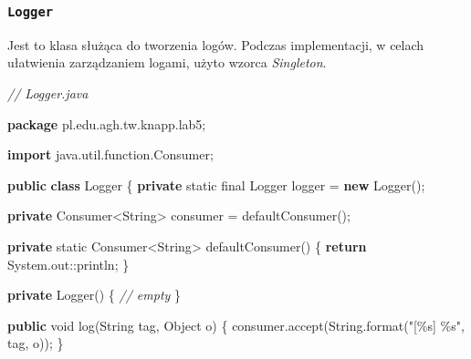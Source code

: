 \documentclass[11pt]{article}
\newenvironment{Shaded}{}{}
\newcommand{\KeywordTok}[1]{\textcolor[rgb]{0.00,0.44,0.13}{\textbf{{#1}}}}
\newcommand{\DataTypeTok}[1]{\textcolor[rgb]{0.56,0.13,0.00}{{#1}}}
\newcommand{\StringTok}[1]{\textcolor[rgb]{0.25,0.44,0.63}{{#1}}}
\newcommand{\CommentTok}[1]{\textcolor[rgb]{0.38,0.63,0.69}{\textit{{#1}}}}
\newcommand{\FunctionTok}[1]{\textcolor[rgb]{0.02,0.16,0.49}{{#1}}}
\newcommand{\NormalTok}[1]{{#1}}
\newcommand{\SpecialCharTok}[1]{\textcolor[rgb]{0.25,0.44,0.63}{{#1}}}
\newcommand{\ImportTok}[1]{{#1}}
\newcommand{\ControlFlowTok}[1]{\textcolor[rgb]{0.00,0.44,0.13}{\textbf{{#1}}}}
\newcommand{\OperatorTok}[1]{\textcolor[rgb]{0.40,0.40,0.40}{{#1}}}
\newcommand{\BuiltInTok}[1]{{#1}}
\begin{document}
    \hypertarget{logger}{%
\subsubsection{\texorpdfstring{\texttt{Logger}}{Logger}}\label{logger}}

Jest to klasa służąca do tworzenia logów. Podczas implementacji, w
celach ułatwienia zarządzaniem logami, użyto wzorca \emph{Singleton}.

\begin{Shaded}
\begin{Highlighting}[]
\CommentTok{// Logger.java}

\KeywordTok{package}\ImportTok{ pl}\OperatorTok{.}\ImportTok{edu}\OperatorTok{.}\ImportTok{agh}\OperatorTok{.}\ImportTok{tw}\OperatorTok{.}\ImportTok{knapp}\OperatorTok{.}\ImportTok{lab5}\OperatorTok{;}

\KeywordTok{import} \ImportTok{java}\OperatorTok{.}\ImportTok{util}\OperatorTok{.}\ImportTok{function}\OperatorTok{.}\ImportTok{Consumer}\OperatorTok{;}

\KeywordTok{public} \KeywordTok{class} \BuiltInTok{Logger} \OperatorTok{\{}
    \KeywordTok{private} \DataTypeTok{static} \DataTypeTok{final} \BuiltInTok{Logger}\NormalTok{ logger }\OperatorTok{=} \KeywordTok{new} \BuiltInTok{Logger}\OperatorTok{();}

    \KeywordTok{private}\NormalTok{ Consumer}\OperatorTok{\textless{}}\BuiltInTok{String}\OperatorTok{\textgreater{}}\NormalTok{ consumer }\OperatorTok{=} \FunctionTok{defaultConsumer}\OperatorTok{();}

    \KeywordTok{private} \DataTypeTok{static}\NormalTok{ Consumer}\OperatorTok{\textless{}}\BuiltInTok{String}\OperatorTok{\textgreater{}} \FunctionTok{defaultConsumer}\OperatorTok{()} \OperatorTok{\{}
        \ControlFlowTok{return} \BuiltInTok{System}\OperatorTok{.}\FunctionTok{out}\OperatorTok{::}\NormalTok{println}\OperatorTok{;}
    \OperatorTok{\}}

    \KeywordTok{private} \BuiltInTok{Logger}\OperatorTok{()} \OperatorTok{\{}
        \CommentTok{// empty}
    \OperatorTok{\}}

    \KeywordTok{public} \DataTypeTok{void} \FunctionTok{log}\OperatorTok{(}\BuiltInTok{String}\NormalTok{ tag}\OperatorTok{,} \BuiltInTok{Object}\NormalTok{ o}\OperatorTok{)} \OperatorTok{\{}
\NormalTok{        consumer}\OperatorTok{.}\FunctionTok{accept}\OperatorTok{(}\BuiltInTok{String}\OperatorTok{.}\FunctionTok{format}\OperatorTok{(}\StringTok{"[}\SpecialCharTok{\%s}\StringTok{] }\SpecialCharTok{\%s}\StringTok{"}\OperatorTok{,}\NormalTok{ tag}\OperatorTok{,}\NormalTok{ o}\OperatorTok{));}
    \OperatorTok{\}}


\end{Highlighting}
\end{Shaded}
\end{document}
